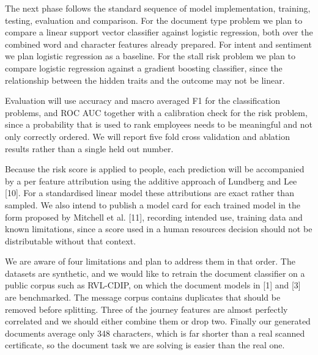 \documentclass[conference]{IEEEtran}
\begin{document}
The next phase follows the standard sequence of model implementation, training, testing, evaluation and comparison. For the document type problem we plan to compare a linear support vector classifier against logistic regression, both over the combined word and character features already prepared. For intent and sentiment we plan logistic regression as a baseline. For the stall risk problem we plan to compare logistic regression against a gradient boosting classifier, since the relationship between the hidden traits and the outcome may not be linear.

Evaluation will use accuracy and macro averaged F1 for the classification problems, and ROC AUC together with a calibration check for the risk problem, since a probability that is used to rank employees needs to be meaningful and not only correctly ordered. We will report five fold cross validation and ablation results rather than a single held out number.

Because the risk score is applied to people, each prediction will be accompanied by a per feature attribution using the additive approach of Lundberg and Lee [10]. For a standardised linear model these attributions are exact rather than sampled. We also intend to publish a model card for each trained model in the form proposed by Mitchell et al. [11], recording intended use, training data and known limitations, since a score used in a human resources decision should not be distributable without that context.

We are aware of four limitations and plan to address them in that order. The datasets are synthetic, and we would like to retrain the document classifier on a public corpus such as RVL-CDIP, on which the document models in [1] and [3] are benchmarked. The message corpus contains duplicates that should be removed before splitting. Three of the journey features are almost perfectly correlated and we should either combine them or drop two. Finally our generated documents average only 348 characters, which is far shorter than a real scanned certificate, so the document task we are solving is easier than the real one.
\end{document}
